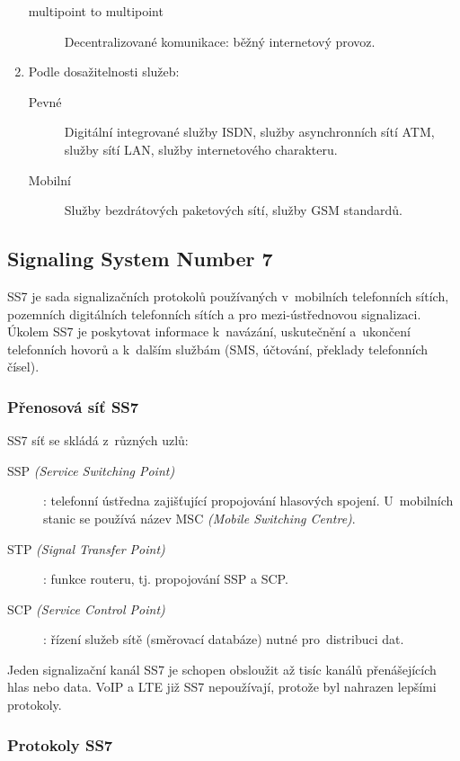 \begin{enumerate}
\begin{description}
              \item[multipoint to multipoint] Decentralizované komunikace: běžný internetový provoz.
          \end{description}
    \item Podle dosažitelnosti služeb:
          \begin{description}
              \item[Pevné] Digitální integrované služby ISDN, služby asynchronních sítí ATM, služby sítí LAN, služby internetového charakteru.
              \item[Mobilní] Služby bezdrátových paketových sítí, služby GSM standardů.
          \end{description}
\end{enumerate}

\subsection{Signaling System Number 7}

SS7 je sada signalizačních protokolů používaných v~mobilních telefonních sítích, pozemních digitálních telefonních sítích a pro mezi-ústřednovou signalizaci.
Úkolem SS7 je poskytovat informace k~navázání, uskutečnění a~ukončení telefonních hovorů a k~dalším službám (SMS, účtování, překlady telefonních čísel).


\subsubsection{Přenosová síť SS7}

SS7 síť se skládá z~různých uzlů:
\begin{description}
    \item[SSP \emph{(Service Switching Point)}]:
    telefonní ústředna zajišťující propojování hlasových spojení.
    U~mobilních stanic se používá název MSC \emph{(Mobile Switching Centre)}.
    \item[STP \emph{(Signal Transfer Point)}]:
    funkce routeru, tj. propojování SSP a SCP.
    \item[SCP \emph{(Service Control Point)}]:
    řízení služeb sítě (směrovací databáze) nutné pro~distribuci dat.
\end{description}

Jeden signalizační kanál SS7 je schopen obsloužit až tisíc kanálů přenášejících hlas nebo data.
VoIP a LTE již SS7 nepoužívají, protože byl nahrazen lepšími protokoly.

\subsubsection{Protokoly SS7}


